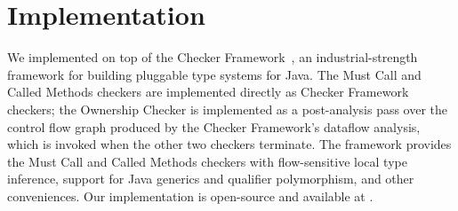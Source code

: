 \section{Implementation}
\label{sec:implementation}

We implemented \Tool on top of the Checker Framework~\cite{PapiACPE2008},
an industrial-strength framework for building pluggable type systems
for Java. The Must Call and Called Methods checkers are implemented
directly as Checker Framework checkers; the Ownership Checker is
implemented as a post-analysis pass over the control flow graph
produced by the Checker Framework's dataflow analysis, which is invoked
when the other two checkers terminate. The framework provides the
Must Call and Called Methods checkers with flow-sensitive local type
inference, support for Java generics and qualifier polymorphism, and
other conveniences. Our implementation is open-source and available
at .
